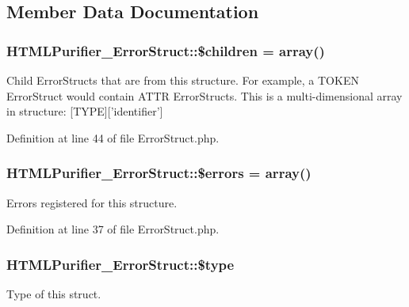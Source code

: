 \subsection{Member Data Documentation}
\hypertarget{classHTMLPurifier__ErrorStruct_a6d353ce9c9ce6e7d80e8f69dcf4f939f}{
\subsubsection[{\$children}]{\setlength{\rightskip}{0pt plus 5cm}H\+T\+M\+L\+Purifier\+\_\+\+Error\+Struct\+::\$children = array()}}\label{classHTMLPurifier__ErrorStruct_a6d353ce9c9ce6e7d80e8f69dcf4f939f}
Child Error\+Structs that are from this structure. For example, a T\+O\+K\+E\+N Error\+Struct would contain A\+T\+T\+R Error\+Structs. This is a multi-\/dimensional array in structure\+: \mbox{[}T\+Y\+P\+E\mbox{]}\mbox{[}'identifier'\mbox{]} 

Definition at line 44 of file Error\+Struct.\+php.

\hypertarget{classHTMLPurifier__ErrorStruct_a370433ac100a38c2da678c5c787554e1}{
\subsubsection[{\$errors}]{\setlength{\rightskip}{0pt plus 5cm}H\+T\+M\+L\+Purifier\+\_\+\+Error\+Struct\+::\$errors = array()}}\label{classHTMLPurifier__ErrorStruct_a370433ac100a38c2da678c5c787554e1}
Errors registered for this structure. 

Definition at line 37 of file Error\+Struct.\+php.

\hypertarget{classHTMLPurifier__ErrorStruct_ab0df20e74f43d79b9b5fc220b3db5ab6}{
\subsubsection[{\$type}]{\setlength{\rightskip}{0pt plus 5cm}H\+T\+M\+L\+Purifier\+\_\+\+Error\+Struct\+::\$type}}\label{classHTMLPurifier__ErrorStruct_ab0df20e74f43d79b9b5fc220b3db5ab6}
Type of this struct. 

